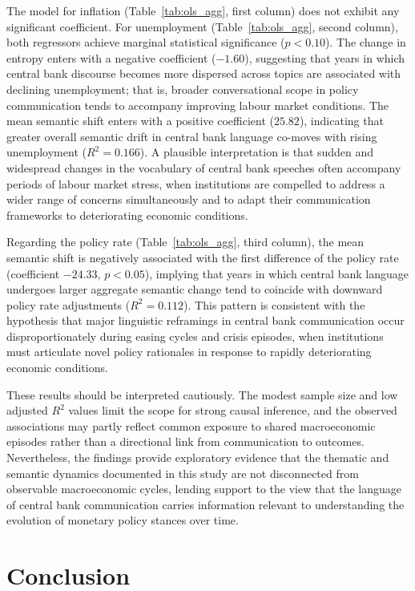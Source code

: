 The model for inflation (Table~\ref{tab:ols_agg}, first column) does not exhibit any significant coefficient. For unemployment (Table~\ref{tab:ols_agg}, second column), both regressors achieve marginal statistical significance ($p < 0.10$). The change in entropy enters with a negative coefficient ($-1.60$), suggesting that years in which central bank discourse becomes more dispersed across topics are associated with declining unemployment; that is, broader conversational scope in policy communication tends to accompany improving labour market conditions. The mean semantic shift enters with a positive coefficient ($25.82$), indicating that greater overall semantic drift in central bank language co-moves with rising unemployment ($R^2 = 0.166$). A plausible interpretation is that sudden and widespread changes in the vocabulary of central bank speeches often accompany periods of labour market stress, when institutions are compelled to address a wider range of concerns simultaneously and to adapt their communication frameworks to deteriorating economic conditions.

Regarding the policy rate (Table~\ref{tab:ols_agg}, third column), the mean semantic shift is negatively associated with the first difference of the policy rate (coefficient $-24.33$, $p < 0.05$), implying that years in which central bank language undergoes larger aggregate semantic change tend to coincide with downward policy rate adjustments ($R^2 = 0.112$). This pattern is consistent with the hypothesis that major linguistic reframings in central bank communication occur disproportionately during easing cycles and crisis episodes, when institutions must articulate novel policy rationales in response to rapidly deteriorating economic conditions. 

These results should be interpreted cautiously. The modest sample size and low adjusted $R^2$ values limit the scope for strong causal inference, and the observed associations may partly reflect common exposure to shared macroeconomic episodes rather than a directional link from communication to outcomes. Nevertheless, the findings provide exploratory evidence that the thematic and semantic dynamics documented in this study are not disconnected from observable macroeconomic cycles, lending support to the view that the language of central bank communication carries information relevant to understanding the evolution of monetary policy stances over time.


\section{Conclusion}\label{sec5}

